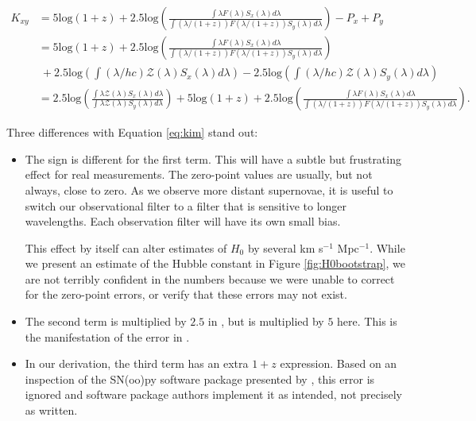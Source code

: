 \documentclass[linenumbers]{aastex631}
\begin{document}
\begin{equation}
\begin{aligned}
  K_{xy} &= 5 \text{log} (1 + z)
            + 2.5 \text{log} \left(
              \frac{\int \lambda F(\lambda) S_x(\lambda) d\lambda}
                   {\int (\lambda / (1+z)) F(\lambda / (1+z)) S_y(\lambda) d\lambda} \right)
            - P_x + P_y \\
         &= 5 \text{log} (1 + z)
            + 2.5 \text{log} \left(
              \frac{\int \lambda F(\lambda) S_x(\lambda) d\lambda}
                   {\int (\lambda / (1+z)) F(\lambda / (1+z)) S_y(\lambda) d\lambda} \right) \\ &\ 
            + 2.5 \text{log} \left( \int (\lambda / hc) \mathcal{Z}(\lambda) S_x(\lambda) d\lambda \right)
            - 2.5 \text{log} \left( \int (\lambda / hc) \mathcal{Z}(\lambda) S_y(\lambda) d\lambda \right) \\
         &= 2.5 \text{log} \left(
              \frac{\int \lambda \mathcal{Z}(\lambda) S_x(\lambda) d\lambda}
                   {\int \lambda \mathcal{Z}(\lambda) S_y(\lambda) d\lambda}
             \right)
            + 5 \text{log} (1 + z)
            + 2.5 \text{log} \left(
              \frac{\int \lambda F(\lambda) S_x(\lambda) d\lambda}
                   {\int (\lambda / (1+z)) F(\lambda / (1+z)) S_y(\lambda) d\lambda} \right) .
\end{aligned}
\end{equation}

Three differences with Equation \ref{eq:kim} stand out:

\begin{itemize}
  \item The sign is different for the first term. This will have a subtle but
  frustrating effect for real measurements. The zero-point values are usually,
  but not always, close to zero. As we observe more distant supernovae, it is
  useful to switch our observational filter to a filter that is sensitive to
  longer wavelengths. Each observation filter will have its own small bias.

  This effect by itself can alter estimates of $H_0$ by several km s$^{-1}$
  Mpc$^{-1}$.  While we present an estimate of the Hubble constant in Figure
  \ref{fig:H0bootstrap}, we are not terribly confident in the numbers because
  we were unable to correct for the zero-point errors, or verify that these
  errors may not exist.

  \item The second term is multiplied by $2.5$ in \citet{kim1996}, but is
  multiplied by $5$ here. This is the manifestation of the error in
  \citet{tolman1930}.

  \item In our derivation, the third term has an extra $1 + z$ expression.
  Based on an inspection of the SN(oo)py software package presented by
  \citet{snpy}, this error is ignored and software package authors implement it
  as intended, not precisely as written.
\end{itemize}
\end{document}
